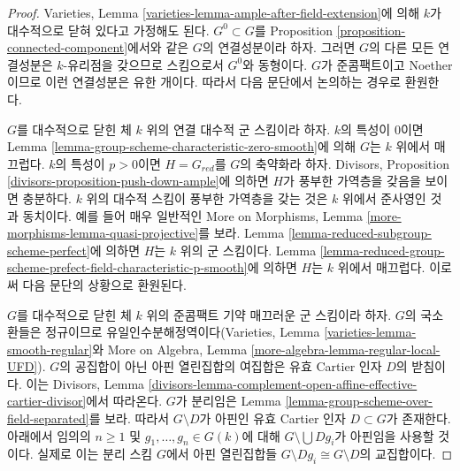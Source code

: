 \begin{proof}
Varieties, Lemma \ref{varieties-lemma-ample-after-field-extension}에 의해 $k$가 대수적으로 닫혀 있다고 가정해도 된다.
$G^0 \subset G$를 Proposition \ref{proposition-connected-component}에서와 같은 $G$의 연결성분이라 하자.
그러면 $G$의 다른 모든 연결성분은 $k$-유리점을 갖으므로 스킴으로서 $G^0$와 동형이다.
$G$가 준콤팩트이고 Noether이므로 이런 연결성분은 유한 개이다. 따라서 다음 문단에서 논의하는 경우로 환원한다.

\medskip\noindent
$G$를 대수적으로 닫힌 체 $k$ 위의 연결 대수적 군 스킴이라 하자. $k$의 특성이 0이면
Lemma \ref{lemma-group-scheme-characteristic-zero-smooth}에 의해 $G$는 $k$ 위에서 매끄럽다.
$k$의 특성이 $p > 0$이면 $H = G_{red}$를 $G$의 축약화라 하자. Divisors, Proposition
\ref{divisors-proposition-push-down-ample}에 의하면 $H$가 풍부한 가역층을 갖음을 보이면 충분하다.
$k$ 위의 대수적 스킴이 풍부한 가역층을 갖는 것은 $k$ 위에서 준사영인 것과 동치이다.
예를 들어 매우 일반적인 More on Morphisms, Lemma
\ref{more-morphisms-lemma-quasi-projective}를 보라. Lemma \ref{lemma-reduced-subgroup-scheme-perfect}에 의하면
$H$는 $k$ 위의 군 스킴이다. Lemma \ref{lemma-reduced-group-scheme-prefect-field-characteristic-p-smooth}에 의하면
$H$는 $k$ 위에서 매끄럽다. 이로써 다음 문단의 상황으로 환원된다.

\medskip\noindent
$G$를 대수적으로 닫힌 체 $k$ 위의 준콤팩트 기약 매끄러운 군 스킴이라 하자. $G$의 국소환들은 정규이므로
유일인수분해정역이다(Varieties, Lemma \ref{varieties-lemma-smooth-regular}와 More on Algebra, Lemma
\ref{more-algebra-lemma-regular-local-UFD}). $G$의 공집합이 아닌 아핀 열린집합의 여집합은 유효 Cartier 인자 $D$의 받침이다.
이는 Divisors, Lemma \ref{divisors-lemma-complement-open-affine-effective-cartier-divisor}에서 따라온다.
$G$가 분리임은 Lemma \ref{lemma-group-scheme-over-field-separated}를 보라. 따라서 $G \setminus D$가 아핀인 유효 Cartier 인자
$D \subset G$가 존재한다. 아래에서 임의의 $n \geq 1$ 및 $g_1, \ldots, g_n \in G(k)$에 대해
$G \setminus \bigcup D g_i$가 아핀임을 사용할 것이다. 실제로 이는 분리 스킴 $G$에서 아핀 열린집합들
$G \setminus Dg_i \cong G \setminus D$의 교집합이다.


\end{proof}
